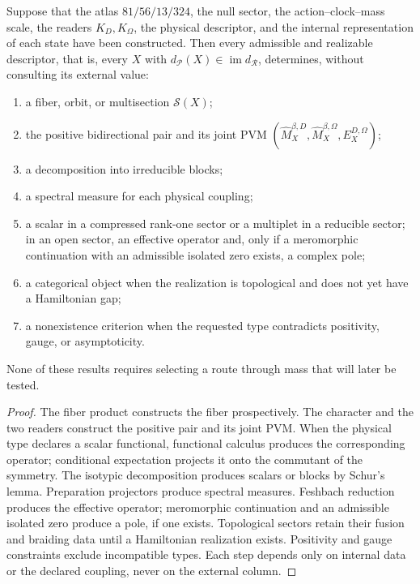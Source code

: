 \begin{theorem}
Suppose that the atlas \(81/56/13/324\), the null sector, the
action--clock--mass scale, the readers \(K_D,K_\Omega\), the physical descriptor, and the
internal representation of each state have been constructed. Then every admissible and
realizable descriptor, that is, every \(X\) with
\(d_{\mathcal P}(X)\in\operatorname{im}d_{\mathcal R}\),
determines, without consulting its external value:
\begin{enumerate}
\item a fiber, orbit, or multisection \(\mathscr S(X)\);
\item the positive bidirectional pair and its joint PVM
      \((\widehat M_X^{\beta,D},\widehat M_X^{\beta,\Omega},
      E_X^{D,\Omega})\);
\item a decomposition into irreducible blocks;
\item a spectral measure for each physical coupling;
\item a scalar in a compressed rank-one sector or a multiplet in a
      reducible sector; in an open sector, an effective operator and, only if
      a meromorphic continuation with an admissible isolated zero exists, a
      complex pole;
\item a categorical object when the realization is topological and does not yet have
      a Hamiltonian gap;
\item a nonexistence criterion when the requested type contradicts
      positivity, gauge, or asymptoticity.
\end{enumerate}
None of these results requires selecting a route through mass
that will later be tested.
\end{theorem}

\begin{proof}
The fiber product constructs the fiber prospectively. The character and the
two readers construct the positive pair and its joint PVM. When the physical
type declares a scalar functional, functional calculus produces the corresponding
operator; conditional expectation projects it onto the commutant of the
symmetry. The isotypic decomposition produces scalars or blocks by Schur's
lemma. Preparation projectors produce spectral measures.
Feshbach reduction produces the effective operator; meromorphic continuation
and an admissible isolated zero produce a pole, if one exists. Topological
sectors retain their fusion and braiding data until a Hamiltonian
realization exists. Positivity and gauge constraints
exclude incompatible types. Each step depends only on internal data or
the declared coupling, never on the external column.
\end{proof}

